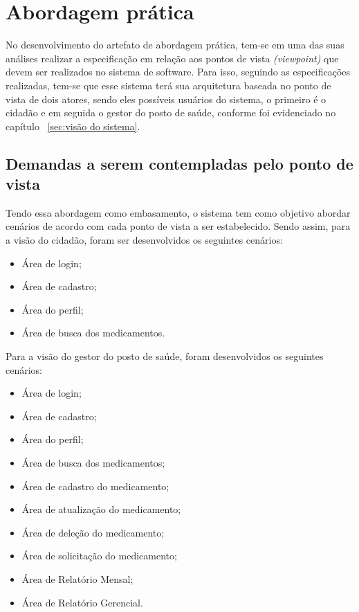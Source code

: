 \section{Abordagem prática}
No desenvolvimento do artefato de abordagem prática, tem-se em uma das suas análises realizar a especificação em relação aos pontos de vista \emph{(viewpoint)} que devem ser realizados no sistema de software. Para isso, seguindo as especificações realizadas, tem-se que esse sistema terá sua arquitetura baseada no ponto de vista de dois atores, sendo eles possíveis usuários do sistema, o primeiro é o cidadão e em seguida o gestor do posto de saúde, conforme foi evidenciado no capítulo  ~\ref{sec:visão do sistema}.

\subsection{Demandas a serem contempladas pelo ponto de vista}

Tendo essa abordagem como embasamento, o sistema tem como objetivo abordar cenários de acordo com cada ponto de vista a ser estabelecido. Sendo assim, para a visão do cidadão, foram ser desenvolvidos os seguintes cenários:
\begin{itemize}
    \item Área de login;
    \item Área de cadastro;
    \item Área do perfil;
    \item Área de busca dos medicamentos.
\end{itemize}

Para a visão do gestor do posto de saúde, foram desenvolvidos os seguintes cenários:

\begin{itemize}
    \item Área de login;
    \item Área de cadastro;
    \item Área do perfil;
    \item Área de busca dos medicamentos;
    \item Área de cadastro do medicamento;
    \item Área de atualização do medicamento;
    \item Área de deleção do medicamento;
    \item Área de solicitação do medicamento;
    \item Área de Relatório Mensal;
    \item Área de Relatório Gerencial.
\end{itemize}

